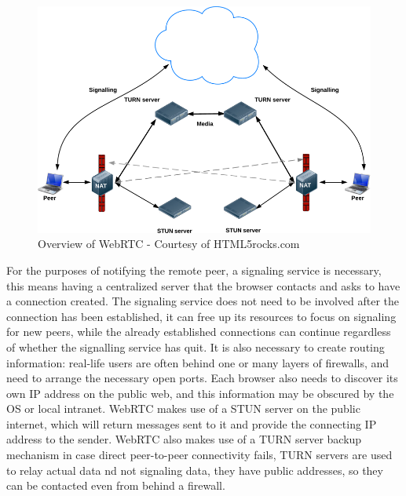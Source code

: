 \begin{figure}[H]
	\centering
	\includegraphics[scale=0.4]{gfx/webrtc-connect}
	\caption{Overview of WebRTC - Courtesy of HTML5rocks.com}
	\label{fig:webrtc-connect}
\end{figure}

For the purposes of notifying the remote peer, a signaling service is necessary,
this means having a centralized server that the browser contacts and asks to have a connection created.
The signaling service does not need to be involved after the connection has been established,
it can free up its resources to focus on signaling for new peers, 
while the already established connections can continue regardless of whether the signalling service has quit.
It is also necessary to create routing information:
real-life users are often behind one or many layers of firewalls, 
and need to arrange the necessary open ports.
Each browser also needs to discover its own IP address on the public web, 
and this information may be obscured by the OS or local intranet.
WebRTC makes use of a STUN server on the public internet, 
which will return messages sent to it and provide the connecting IP address to the sender.
WebRTC also makes use of a TURN server backup mechanism in case direct peer-to-peer connectivity fails,
TURN servers are used to relay actual data nd not signaling data, they have public addresses, 
so they can be contacted even from behind a firewall.
